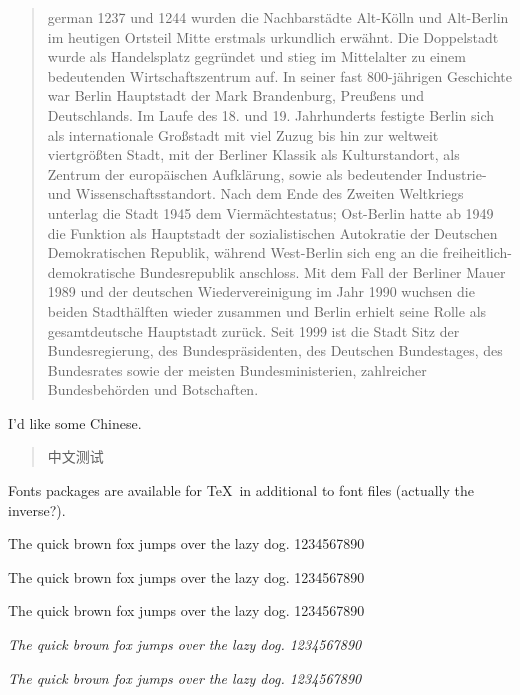 \documentclass[a4paper,12pt]{article}
\newcommand{\pangram}[1][\rmfamily]{{#1 The quick brown fox jumps
over the lazy dog. 1234567890}\par}
\begin{document}
\begin{quotation}
\begin{otherlanguage*}{german}
  1237 und 1244 wurden die Nachbarstädte Alt-Kölln und Alt-Berlin im heutigen Ortsteil Mitte erstmals urkundlich erwähnt. Die Doppelstadt wurde als Handelsplatz gegründet und stieg im Mittelalter zu einem bedeutenden Wirtschaftszentrum auf. In seiner fast 800-jährigen Geschichte war Berlin Hauptstadt der Mark Brandenburg, Preußens und Deutschlands. Im Laufe des 18. und 19. Jahrhunderts festigte Berlin sich als internationale Großstadt mit viel Zuzug bis hin zur weltweit viertgrößten Stadt, mit der Berliner Klassik als Kulturstandort, als Zentrum der europäischen Aufklärung, sowie als bedeutender Industrie- und Wissenschaftsstandort. Nach dem Ende des Zweiten Weltkriegs unterlag die Stadt 1945 dem Viermächtestatus; Ost-Berlin hatte ab 1949 die Funktion als Hauptstadt der sozialistischen Autokratie der Deutschen Demokratischen Republik, während West-Berlin sich eng an die freiheitlich-demokratische Bundesrepublik anschloss. Mit dem Fall der Berliner Mauer 1989 und der deutschen Wiedervereinigung im Jahr 1990 wuchsen die beiden Stadthälften wieder zusammen und Berlin erhielt seine Rolle als gesamtdeutsche Hauptstadt zurück. Seit 1999 ist die Stadt Sitz der Bundesregierung, des Bundespräsidenten, des Deutschen Bundestages, des Bundesrates sowie der meisten Bundesministerien, zahlreicher Bundesbehörden und Botschaften.
\end{otherlanguage*}
\end{quotation}

I'd like some Chinese.


\begin{quotation}
\foreignlanguage{chinese}{中文测试}
\end{quotation}

Fonts packages are available for \TeX\ in additional to font files (actually the inverse?).

\pangram[\rmfamily]
\pangram[\sffamily]
\pangram[\ttfamily]
\pangram[\itshape]
\pangram[\slshape]
\end{document}
